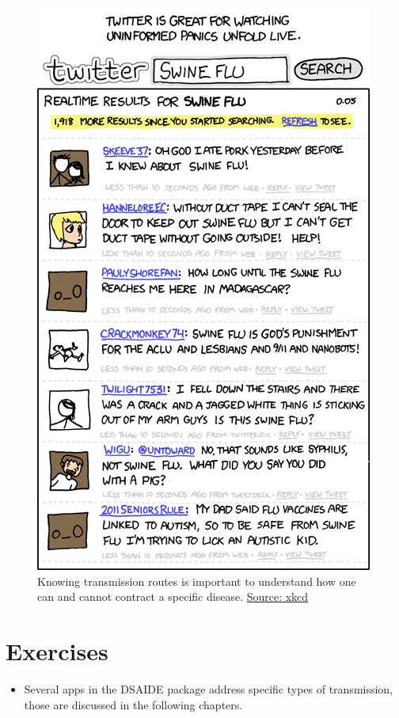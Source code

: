 \documentclass[]{book}
\providecommand{\tightlist}{%
  \setlength{\itemsep}{0pt}\setlength{\parskip}{0pt}}
\theoremstyle{definition}
\theoremstyle{definition}
\theoremstyle{definition}
\theoremstyle{remark}
\begin{document}
\begin{figure}
\centering
\includegraphics{./images/xkcd-swine_flu.png}
\caption{Knowing transmission routes is important to understand how one
can and cannot contract a specific disease.
\href{https://xkcd.com/574/}{Source: xkcd}}
\end{figure}

\section{Exercises}\label{exercises-4}

\begin{itemize}
\tightlist
\item
  Several apps in the DSAIDE package address specific types of
  transmission, those are discussed in the following chapters.
\end{itemize}
\end{document}
